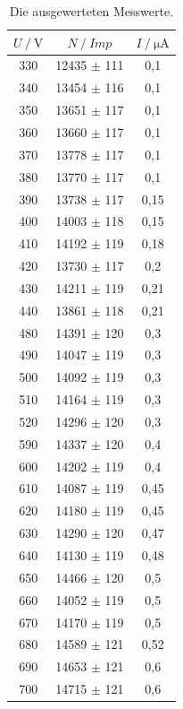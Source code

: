 \begin{table}
  \centering
  \caption{Die ausgewerteten Messwerte.}
  \begin{tabular}{ccc}
    \toprule
    {$U  \mathbin{/} \unit{\volt}$} &
    {$N \mathbin{/} \mathbin{Imp}$} &
    {$I \mathbin{/} \unit{\micro\ampere}$} \\
    \midrule
    330  &  12435  $\pm$ 111   &  0,1   \\
    340  &  13454  $\pm$ 116   &  0,1   \\
    350  &  13651  $\pm$ 117   &  0,1   \\
    360  &  13660  $\pm$ 117   &  0,1   \\
    370  &  13778  $\pm$ 117   &  0,1   \\
    380  &  13770  $\pm$ 117   &  0,1   \\
    390  &  13738  $\pm$ 117   &  0,15  \\
    400  &  14003  $\pm$ 118   &  0,15  \\
    410  &  14192  $\pm$ 119   &  0,18  \\
    420  &  13730  $\pm$ 117   &  0,2   \\
    430  &  14211  $\pm$ 119   &  0,21  \\
    440  &  13861  $\pm$ 118   &  0,21  \\
    480  &  14391  $\pm$ 120   &  0,3   \\
    490  &  14047  $\pm$ 119   &  0,3   \\
    500  &  14092  $\pm$ 119   &  0,3   \\
    510  &  14164  $\pm$ 119   &  0,3   \\
    520  &  14296  $\pm$ 120   &  0,3   \\
    590  &  14337  $\pm$ 120   &  0,4   \\
    600  &  14202  $\pm$ 119   &  0,4   \\
    610  &  14087  $\pm$ 119   &  0,45  \\
    620  &  14180  $\pm$ 119   &  0,45  \\
    630  &  14290  $\pm$ 120   &  0,47  \\
    640  &  14130  $\pm$ 119   &  0,48  \\
    650  &  14466  $\pm$ 120   &  0,5   \\
    660  &  14052  $\pm$ 119   &  0,5   \\
    670  &  14170  $\pm$ 119   &  0,5   \\
    680  &  14589  $\pm$ 121   &  0,52  \\
    690  &  14653  $\pm$ 121   &  0,6   \\
    700  &  14715  $\pm$ 121   &  0,6   \\
    \bottomrule
  \end{tabular}
  \label{tab:charak}
\end{table}

